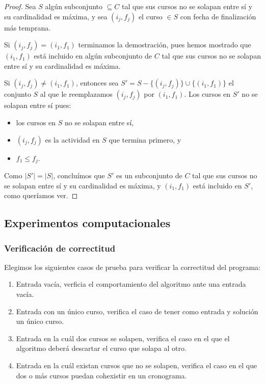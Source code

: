 \documentclass[a4paper, 10pt, twoside]{article}
\begin{document}
\begin{proof}
    Sea $S$ algún subconjunto $\subseteq C$ tal que sus cursos no se solapan entre sí y su cardinalidad es máxima, y sea $(i_j, f_j)$ el curso $\in S$ con fecha de finalización más temprana.

    Si $(i_j, f_j) = (i_1, f_1)$ terminamos la demostración, pues hemos mostrado que $(i_1, f_1)$ está incluido en algún subconjunto de $C$ tal que sus cursos no se solapan entre sí y su cardinalidad es máxima.

    Si $(i_j, f_j) \neq (i_1, f_1)$, entonces sea $S' = S - \{ (i_j, f_j) \} \cup \{ (i_1, f_1) \}$ el conjunto $S$ al que le reemplazamos $(i_j, f_j)$ por $(i_1, f_1)$. Los cursos en $S'$ no se solapan entre sí pues:

    \begin{itemize}[nolistsep]
        \item{los cursos en $S$ no se solapan entre sí,}
        \item{$(i_j, f_j)$ es la actividad en $S$ que termina primero, y}
        \item{$f_1 \leq f_j$.}
    \end{itemize}

    Como $|S'| = |S|$, concluímos que $S'$ es un subconjunto de $C$ tal que sus cursos no se solapan entre sí y su cardinalidad es máxima, y $(i_1, f_1)$ está incluido en $S'$, como queríamos ver.
\end{proof}


\subsection{Experimentos computacionales}

\subsubsection{Verificación de correctitud}

Elegimos los siguientes casos de prueba para verificar la correctitud del programa:

\begin{enumerate}
\item Entrada vacía, verficia el comportamiento del algoritmo ante una entrada vacía.
\item Entrada con un único curso, verifica el caso de tener como entrada y solución un único curso.
\item Entrada en la cuál dos cursos se solapen, verifica el caso en el que el algoritmo deberá descartar el curso que solapa al otro.
\item Entrada en la cuál existan cursos que no se solapen, verifica el caso en el que dos o más cursos puedan cohexistir en un cronograma.
\end{enumerate}
\end{document}
